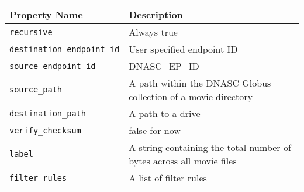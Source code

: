 \begin{tabularx}{\textwidth}{l|X}
\hline
 Property Name           & Description                                                          \\
\hline
 \texttt{recursive}               & Always true                                                          \\
 \texttt{destination\_endpoint\_id} & User specified endpoint ID                                           \\
 \texttt{source\_endpoint\_id}      & DNASC\_EP\_ID                                                          \\
 \texttt{source\_path}             & A path within the DNASC Globus collection of a movie directory       \\
 \texttt{destination\_path}        & A path to a drive                                                    \\
 \texttt{verify\_checksum}         & false for now                                                        \\
 \texttt{label}                   & A string containing the total number of bytes across all movie files \\
 \texttt{filter\_rules}            & A list of filter rules                                               \\
\hline
\end{tabularx}